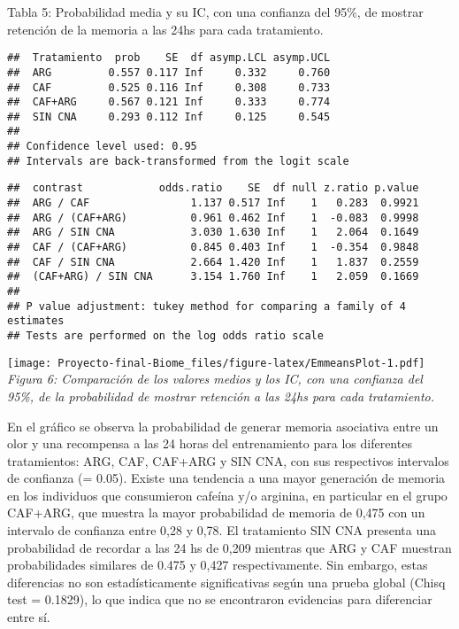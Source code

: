 \documentclass[
  11pt,
]{article}
\begin{document}
Tabla 5: Probabilidad media y su IC, con una confianza del 95\%, de
mostrar retención de la memoria a las 24hs para cada tratamiento.

\begin{verbatim}
##  Tratamiento  prob    SE  df asymp.LCL asymp.UCL
##  ARG         0.557 0.117 Inf     0.332     0.760
##  CAF         0.525 0.116 Inf     0.308     0.733
##  CAF+ARG     0.567 0.121 Inf     0.333     0.774
##  SIN CNA     0.293 0.112 Inf     0.125     0.545
## 
## Confidence level used: 0.95 
## Intervals are back-transformed from the logit scale
\end{verbatim}

\begin{verbatim}
##  contrast            odds.ratio    SE  df null z.ratio p.value
##  ARG / CAF                1.137 0.517 Inf    1   0.283  0.9921
##  ARG / (CAF+ARG)          0.961 0.462 Inf    1  -0.083  0.9998
##  ARG / SIN CNA            3.030 1.630 Inf    1   2.064  0.1649
##  CAF / (CAF+ARG)          0.845 0.403 Inf    1  -0.354  0.9848
##  CAF / SIN CNA            2.664 1.420 Inf    1   1.837  0.2559
##  (CAF+ARG) / SIN CNA      3.154 1.760 Inf    1   2.059  0.1669
## 
## P value adjustment: tukey method for comparing a family of 4 estimates 
## Tests are performed on the log odds ratio scale
\end{verbatim}

\texttt{[image: Proyecto-final-Biome\_files/figure-latex/EmmeansPlot-1.pdf]}
\emph{Figura 6: Comparación de los valores medios y los IC, con una
confianza del 95\%, de la probabilidad de mostrar retención a las 24hs
para cada tratamiento.}

En el gráfico se observa la probabilidad de generar memoria asociativa
entre un olor y una recompensa a las 24 horas del entrenamiento para los
diferentes tratamientos: ARG, CAF, CAF+ARG y SIN CNA, con sus
respectivos intervalos de confianza (\alpha = 0.05). Existe una
tendencia a una mayor generación de memoria en los individuos que
consumieron cafeína y/o arginina, en particular en el grupo CAF+ARG, que
muestra la mayor probabilidad de memoria de 0,475 con un intervalo de
confianza entre 0,28 y 0,78. El tratamiento SIN CNA presenta una
probabilidad de recordar a las 24 hs de 0,209 mientras que ARG y CAF
muestran probabilidades similares de 0.475 y 0,427 respectivamente. Sin
embargo, estas diferencias no son estadísticamente significativas según
una prueba global (Chisq test = 0.1829), lo que indica que no se
encontraron evidencias para diferenciar entre sí.
\end{document}
